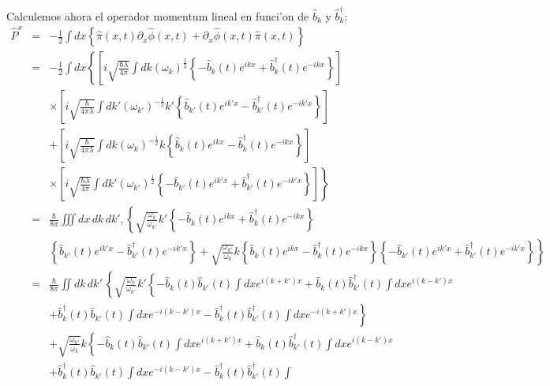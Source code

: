 Calculemos ahora el operador momentum lineal en funci'on de $\hat{b}_k$ y
$\hat{b}_k^\dagger $:
\begin{eqnarray}
\hat{P}^{x} & = &-\frac{1}{2}\int dx\left\{ \hat{\pi}(x,t)
\partial_{x}\hat{\phi}(x,t) +\partial_{x}\hat{\phi}(x,t)
\hat{\pi}(x,t) \right\} \\
& = &-\frac{1}{2}\int dx\left\{
\left[ i\sqrt{\frac{\hbar\lambda}{4\pi}}\int dk\left(
\omega_k\right)^{\frac{1}{2}}\left\{ -\hat{b}_k(t)
e^{ikx}+\hat{b}_k^\dagger (t) e^{-ikx}\right\} \right] \right.\nonumber \\
&& \times \left[
i\sqrt{\frac{\hbar}{4\pi\lambda}}\int dk'\left( \omega_{k'}\right)
^{-\frac{1}{2}}k'\left\{ \hat{b}_{k'}(t) e^{ik'x}-\hat{b}_{k'}^\dagger (t)
e^{-ik'x}\right\} \right] \nonumber \\
&&+\left.\left[ i\sqrt{\frac{\hbar}{4\pi\lambda}}\int dk\left(
\omega_k\right)^{-\frac{1}{2}}k\left\{ \hat{b}_k(t)
e^{ikx}-\hat{b}_k^\dagger (t) e^{-ikx}\right\} \right] \right. \nonumber\\
&& \left. \times\left[
i\sqrt{\frac{\hbar\lambda}{4\pi}}\int dk'\left( \omega_{k'}\right)
^{\frac{1}{2}}\left\{ -\hat{b}_{k'}(t) e^{ik'x}+\hat{b}_{k'}^\dagger (t)
e^{-ik'x}\right\} \right]
\right\} \\
& = &\frac{\hbar}{8\pi}\iiint dx\, dk\, dk',
\left\{\sqrt{\frac{\omega_k}{\omega_{k'}}}k'\left\{ -\hat{b}_k(t)
e^{ikx}+\hat{b}_k^\dagger (t) e^{-ikx}\right\} \right.\nonumber \\
&&\left.\left\{ \hat{b}_{k'}(t) e^{ik'x}-\hat{b}_{k'}^\dagger (t)
e^{-ik'x}\right\} +\sqrt{\frac{\omega_{k'}}{\omega_k}}k\left\{ \hat{b}_k(t)
e^{ikx}-\hat{b}_k^\dagger (t) e^{-ikx}\right\} \left\{ -\hat{b}_{k'}(t)
e^{ik'x}+\hat{b}_{k'}^\dagger (t) e^{-ik'x}\right\}\right\} \\
& = &\frac{\hbar}{8\pi}\iint dk\,dk'\,
\left\{\sqrt{\frac{\omega_k}{\omega_{k'}}}k'\left\{-\hat{b}_k(t)
\hat{b}_{k'}(t) \int dxe^{i(k+k')x}+\hat{b}_k(t) \hat{b}_{k'}^\dagger (t) \int
dxe^{i(k-k') x}\right.\right.\nonumber \\
&&\left.+\hat{b}_k^\dagger (t) \hat{b}_{k'}(t) \int dxe^{-i(k-k')
x}-\hat{b}_k^\dagger (t) \hat{b}_{k'}^\dagger (t) \int dxe^{-i(k+k')x}\right\}
\nonumber \\ &&+\sqrt{\frac{\omega_{k'}}{\omega_k}}k\left\{-\hat{b}_k(t)
\hat{b}_{k'}(t) \int dxe^{i(k+k')x}+\hat{b}_k(t) \hat{b}_{k'}^\dagger (t) \int
dxe^{i(k-k') x}\right.\nonumber \\
&& \left.\left.+\hat{b}_k^\dagger (t) \hat{b}_{k'}(t) \int dxe^{-i(k-k')
x}-\hat{b}_k^\dagger (t) \hat{b}_{k'}^\dagger (t) \int

\end{eqnarray}
